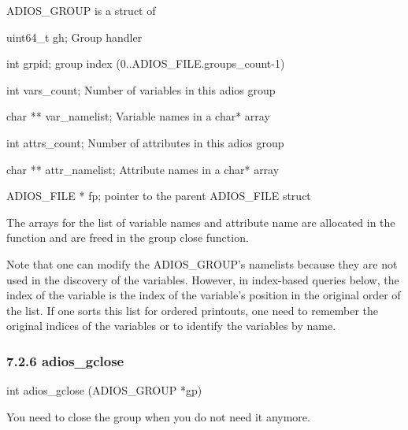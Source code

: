 \vspace{10pt}
ADIOS\_GROUP is a struct of

\vspace{10pt}
\leftskip=22pt
uint64\_t gh;   Group handler

\vspace{10pt}
int grpid;   group index (0..ADIOS\_FILE.groups\_count-1)

\vspace{10pt}
int vars\_count;   Number of variables in this adios group

\vspace{10pt}
char   **  var\_namelist;  Variable names in a char* array 

\vspace{10pt}
int attrs\_count;  Number of attributes in this adios group 

\vspace{10pt}
char   ** attr\_namelist; Attribute names in a char* array 

\vspace{10pt}
ADIOS\_FILE * fp;   pointer to the parent ADIOS\_FILE struct  

\vspace{10pt}
\leftskip=0pt
The arrays for the list of variable names and attribute name are allocated in the 
function and are freed in the group close function.

\vspace{10pt}
Note that one can modify the ADIOS\_GROUP's namelists because they are not used 
in the discovery of the variables. However, in index-based queries below, the index 
of the variable is the index of the variable's position in the original order of 
the list. If one sorts this list for ordered printouts, one need to remember the 
original indices of the variables or to identify the variables by name. \label{HToc182553404}

\vspace{10pt}
\subsubsection*{{\large \textbf{7.2.6 adios\_gclose}}}

\vspace{10pt}
int adios\_gclose (ADIOS\_GROUP *gp)

\vspace{22pt}
You need to close the group when you do not need it anymore. \label{HRef140808163}\label{HToc182553405}

\vspace{10pt}
